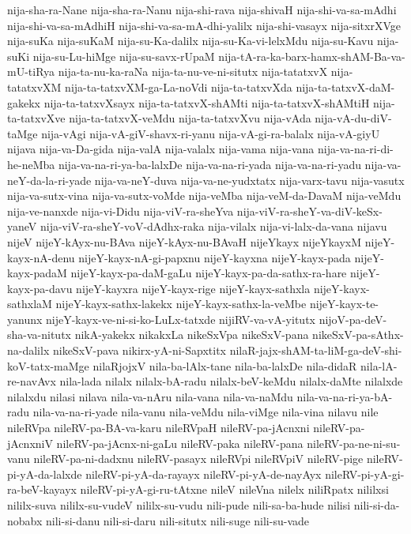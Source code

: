 {nija-sha-ra-Nane
nija-sha-ra-Nanu
nija-shi-rava
nija-shivaH
nija-shi-va-sa-mAdhi
nija-shi-va-sa-mAdhiH
nija-shi-va-sa-mA-dhi-yalilx
nija-shi-vasayx
nija-sitxrXVge
nija-suKa
nija-suKaM
nija-su-Ka-dalilx
nija-su-Ka-vi-lelxMdu
nija-su-Kavu
nija-suKi
nija-su-Lu-hiMge
nija-su-savx-rUpaM
nija-tA-ra-ka-barx-hamx-shAM-Ba-va-mU-tiRya
nija-ta-nu-ka-raNa
nija-ta-nu-ve-ni-situtx
nija-tatatxvX
nija-tatatxvXM
nija-ta-tatxvXM-ga-La-noVdi
nija-ta-tatxvXda
nija-ta-tatxvX-daM-gakekx
nija-ta-tatxvXsayx
nija-ta-tatxvX-shAMti
nija-ta-tatxvX-shAMtiH
nija-ta-tatxvXve
nija-ta-tatxvX-veMdu
nija-ta-tatxvXvu
nija-vAda
nija-vA-du-diV-taMge
nija-vAgi
nija-vA-giV-shavx-ri-yanu
nija-vA-gi-ra-balalx
nija-vA-giyU
nijava
nija-va-Da-gida
nija-valA
nija-valalx
nija-vama
nija-vana
nija-va-na-ri-di-he-neMba
nija-va-na-ri-ya-ba-lalxDe
nija-va-na-ri-yada
nija-va-na-ri-yadu
nija-va-neY-da-la-ri-yade
nija-va-neY-duva
nija-va-ne-yudxtatx
nija-varx-tavu
nija-vasutx
nija-va-sutx-vina
nija-va-sutx-voMde
nija-veMba
nija-veM-da-DavaM
nija-veMdu
nija-ve-nanxde
nija-vi-Didu
nija-viV-ra-sheYva
nija-viV-ra-sheY-va-diV-keSx-yaneV
nija-viV-ra-sheY-voV-dAdhx-raka
nija-vilalx
nija-vi-lalx-da-vana
nijavu
nijeV
nijeY-kAyx-nu-BAva
nijeY-kAyx-nu-BAvaH
nijeYkayx
nijeYkayxM
nijeY-kayx-nA-denu
nijeY-kayx-nA-gi-papxnu
nijeY-kayxna
nijeY-kayx-pada
nijeY-kayx-padaM
nijeY-kayx-pa-daM-gaLu
nijeY-kayx-pa-da-sathx-ra-hare
nijeY-kayx-pa-davu
nijeY-kayxra
nijeY-kayx-rige
nijeY-kayx-sathxla
nijeY-kayx-sathxlaM
nijeY-kayx-sathx-lakekx
nijeY-kayx-sathx-la-veMbe
nijeY-kayx-te-yanunx
nijeY-kayx-ve-ni-si-ko-LuLx-tatxde
nijiRV-va-vA-yitutx
nijoV-pa-deV-sha-va-nitutx
nikA-yakekx
nikakxLa
nikeSxVpa
nikeSxV-pana
nikeSxV-pa-sAthx-na-dalilx
nikeSxV-pava
nikirx-yA-ni-Sapxtitx
nilaR-jajx-shAM-ta-liM-ga-deV-shi-koV-tatx-maMge
nilaRjojxV
nila-ba-lAlx-tane
nila-ba-lalxDe
nila-didaR
nila-lA-re-navAvx
nila-lada
nilalx
nilalx-bA-radu
nilalx-beV-keMdu
nilalx-daMte
nilalxde
nilalxdu
nilasi
nilava
nila-va-nAru
nila-vana
nila-va-naMdu
nila-va-na-ri-ya-bA-radu
nila-va-na-ri-yade
nila-vanu
nila-veMdu
nila-viMge
nila-vina
nilavu
nile
nileRVpa
nileRV-pa-BA-va-karu
nileRVpaH
nileRV-pa-jAcnxni
nileRV-pa-jAcnxniV
nileRV-pa-jAcnx-ni-gaLu
nileRV-paka
nileRV-pana
nileRV-pa-ne-ni-su-vanu
nileRV-pa-ni-dadxnu
nileRV-pasayx
nileRVpi
nileRVpiV
nileRV-pige
nileRV-pi-yA-da-lalxde
nileRV-pi-yA-da-rayayx
nileRV-pi-yA-de-nayAyx
nileRV-pi-yA-gi-ra-beV-kayayx
nileRV-pi-yA-gi-ru-tAtxne
nileV
nileVna
nilelx
niliRpatx
nililxsi
nililx-suva
nililx-su-vudeV
nililx-su-vudu
nili-pude
nili-sa-ba-hude
nilisi
nili-si-da-nobabx
nili-si-danu
nili-si-daru
nili-situtx
nili-suge
nili-su-vade
}
